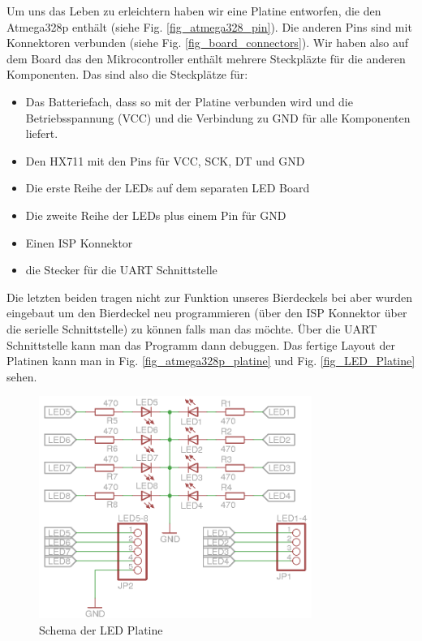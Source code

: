 \documentclass[12pt,journal]{IEEEtran}
\begin{document}
Um uns das Leben zu erleichtern haben wir eine Platine entworfen, die den Atmega328p enthält
(siehe Fig. \ref{fig_atmega328_pin}). Die anderen Pins sind mit Konnektoren verbunden (siehe Fig. \ref{fig_board_connectors}).
Wir haben also auf dem Board das den Mikrocontroller enthält mehrere Steckpläzte für die anderen
Komponenten. Das sind also die Steckplätze für:
\begin{itemize}
 \item Das Batteriefach, dass so mit der Platine verbunden wird und die Betriebsspannung (VCC) und die Verbindung zu GND für alle Komponenten liefert.
 \item Den HX711 mit den Pins für VCC, SCK, DT und GND
 \item Die erste Reihe der LEDs auf dem separaten LED Board
 \item Die zweite Reihe der LEDs plus einem Pin für GND
 \item Einen ISP Konnektor
 \item die Stecker für die UART Schnittstelle
\end{itemize}

Die letzten beiden tragen nicht zur Funktion unseres Bierdeckels bei aber wurden eingebaut um den
Bierdeckel neu programmieren (über den ISP Konnektor über die serielle Schnittstelle) zu können
falls man das möchte. Über die UART Schnittstelle kann man das Programm dann debuggen.
Das fertige Layout der Platinen kann man in Fig. \ref{fig_atmega328p_platine} und Fig. \ref {fig_LED_Platine} sehen.


\begin{figure}[htbp]
  \centering
    \includegraphics[width=3.5in]{images/LED_Platine_Schema_complete.png}
    \caption{Schema der LED Platine}
  \label{fig_led_platine}
\end{figure}
\end{document}
